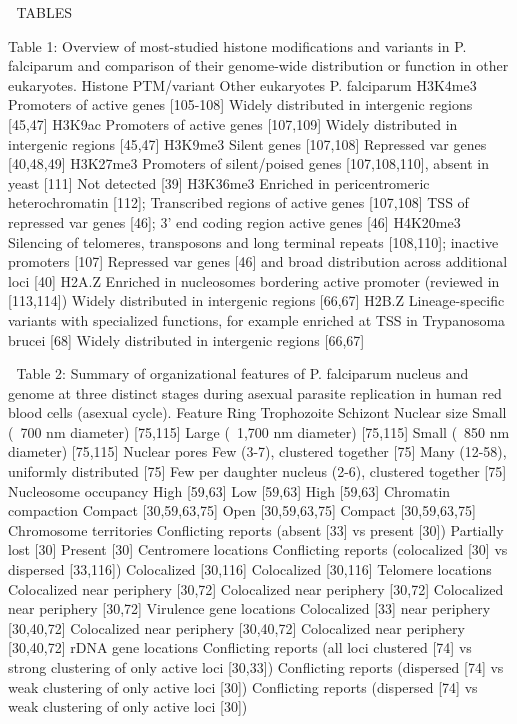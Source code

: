 
TABLES

Table 1: Overview of most-studied histone modifications and variants in P.
falciparum and comparison of their genome-wide distribution or function in
other eukaryotes.
Histone PTM/variant
Other eukaryotes
P. falciparum
H3K4me3
Promoters of active genes [105-108]
Widely distributed in intergenic regions [45,47]
H3K9ac
Promoters of active genes [107,109]
Widely distributed in intergenic regions
[45,47]
H3K9me3
Silent genes [107,108]
Repressed var genes [40,48,49]
H3K27me3
Promoters of silent/poised genes [107,108,110], absent in yeast [111]
Not detected [39]
H3K36me3
Enriched in pericentromeric heterochromatin [112];
Transcribed regions of active genes [107,108]
TSS of repressed var genes [46];
3’ end coding region active genes [46]
H4K20me3
Silencing of telomeres, transposons and long terminal repeats [108,110];
inactive promoters [107]
Repressed var genes [46] and broad distribution across additional loci [40]
H2A.Z
Enriched in nucleosomes bordering active promoter (reviewed in [113,114])
Widely distributed in intergenic regions [66,67]
H2B.Z
Lineage-specific variants with specialized functions, for example enriched at
TSS in Trypanosoma brucei [68]
Widely distributed in intergenic regions [66,67]


Table 2: Summary of organizational features of P. falciparum nucleus and
genome at three distinct stages during asexual parasite replication in human
red blood cells (asexual cycle).
Feature
Ring
Trophozoite
Schizont
Nuclear size
Small (~700 nm diameter) [75,115]
Large (~1,700 nm diameter) [75,115]
Small (~850 nm diameter) [75,115]
Nuclear pores
Few (3-7), clustered together [75]
Many (12-58), uniformly distributed [75]
Few per daughter nucleus (2-6), clustered together [75]
Nucleosome occupancy
High [59,63]
Low [59,63]
High [59,63]
Chromatin compaction
Compact [30,59,63,75]
Open [30,59,63,75]
Compact [30,59,63,75]
Chromosome territories
Conflicting reports (absent [33] vs present [30])
Partially lost [30]
Present [30]
Centromere locations
Conflicting reports (colocalized [30] vs dispersed [33,116])
Colocalized [30,116]
Colocalized [30,116]
Telomere locations
Colocalized near periphery [30,72]
Colocalized near periphery [30,72]
Colocalized near periphery [30,72]
Virulence gene locations
Colocalized [33] near periphery [30,40,72]
Colocalized near periphery [30,40,72]
Colocalized near periphery [30,40,72]
rDNA gene locations
Conflicting reports (all loci clustered [74] vs strong clustering of only
active loci [30,33])
Conflicting reports (dispersed [74] vs weak clustering of only active loci
[30])
Conflicting reports (dispersed [74] vs weak clustering of only active loci
[30])

